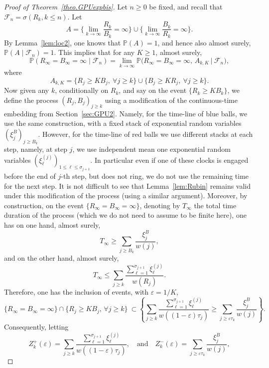 \documentclass[11pt]{article}
\newcommand{\1}{{\text{\Large $\mathfrak 1$}}}
\begin{document}
\begin{proof}[Proof of Theorem~\ref{theo.GPUexpbis}]
Let $n\ge 0$ be fixed, and recall that $\mathcal F_n = \sigma(R_k,k\le n)$. 
Let 
$$A= \Big\{ \lim_{k\to \infty} \frac{R_k}{B_k} = \infty\Big\} \cup \Big\{\lim_{k\to \infty} \frac{B_k}{R_k} = \infty\Big\}.$$ 
By Lemma~\ref{lem:loc2}, one knows that $\mathbb P(A) = 1$, and hence also almost surely, $\mathbb P(A \mid \mathcal F_n) = 1$.  
This implies that  for any $K\ge 1$, almost surely,
\begin{equation}\label{limiteRinftyBinfty}
\mathbb P(R_\infty = B_\infty = \infty \mid \mathcal F_n) = \lim_{k\to \infty} \mathbb P\big(R_\infty = B_\infty = \infty, \, A_{k,K}\ \big|\ \mathcal F_n\big), 
\end{equation}
where 
$$A_{k,K} = \big\{ R_j \ge K B_j, \ \forall j\ge k \big\}\cup \big\{ B_j \ge K R_j, \ \forall j\ge k \big\}. $$ 
Now given any $k$, conditionally on $R_k$, and say on the event $\{R_k \ge KB_k\}$, we define the process $(R_j,B_j)_{j\ge k}$ using a modification of the continuous-time embedding from Section~\ref{sec:GPU2}. Namely, for the time-line of blue balls, we use the same construction, with a fixed stack of exponential random variables $(\xi_j^B)_{j\ge B_k}$. However, for the time-line of red balls we use different stacks at each step, namely, at step $j$, we use independent mean one exponential random variables $(\xi_{\ell}^{(j)})_{1\le \ell \le \sigma_{j+1}}$. In particular even if one of these clocks is engaged before the end of $j$-th step, but does not ring, we do not use the remaining time for the next step. It is not difficult to see that Lemma~\ref{lem:Rubin} remains valid under this modification of the process (using a similar argument). 
Moreover, by construction, on the event $\{R_\infty = B_\infty = \infty\}$, denoting by $T_\infty$ the total time duration of the process (which we do not need to assume  to be finite here), one has on one hand, almost surely,  
$$T_\infty \ge \sum_{j\ge B_k} \frac{\xi_j^B}{w(j)},$$
and on the other hand, almost surely, 
$$T_\infty \le \sum_{j\ge k} \frac{\sum_{\ell=1}^{\sigma_{j+1}} \xi_\ell^{(j)}}{w(R_j)}. $$ 
Therefore, one has the inclusion of events, with $\varepsilon = 1/K$, 
$$\{R_\infty = B_\infty = \infty\}\cap \{R_j\ge K B_j, \, \forall j\ge k\} \ \subset \left\{\sum_{j\ge k} \frac{\sum_{\ell=1}^{\sigma_{j+1}} \xi_\ell^{(j)}}{w((1-\varepsilon)\tau_j)} \ge 
\sum_{j\ge \varepsilon \tau_k} \frac{\xi_j^B}{w(j)}\right\}.$$
Consequently, letting 
$$Z_k^+(\varepsilon) = \sum_{j\ge k} \frac{\sum_{\ell=1}^{\sigma_{j+1}} \xi_\ell^{(j)}}{w((1-\varepsilon)\tau_j)}, \quad\text{and}\quad Z_k^-(\varepsilon) = \sum_{j\ge \varepsilon \tau_k} \frac{\xi_j^B}{w(j)},$$

\end{proof}
\end{document}
